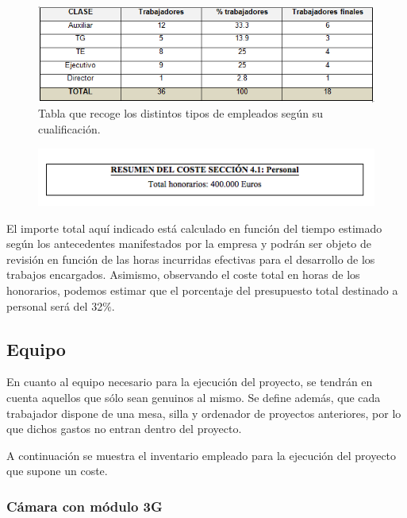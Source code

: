 \documentclass[12pt,oneside,a4paper]{article}
\numberwithin{figure}{section}
\begin{document}
\begin{figure}[H]
\begin{center}
\includegraphics[scale=.8]{Presupuesto_5.png}
\caption{Tabla que recoge los distintos tipos de empleados según su cualificación.}
\end{center}
\end{figure}

\begin{figure}[H]
\begin{center}
\includegraphics[scale=.9]{Presupuesto6.png}
\end{center}
\end{figure}

El importe total aquí indicado está calculado en función del tiempo estimado según los antecedentes manifestados por la empresa y podrán ser objeto de revisión en función de las horas incurridas efectivas para el desarrollo de los trabajos encargados. Asimismo, observando el coste total en horas de los honorarios, podemos estimar que el porcentaje del presupuesto total destinado a personal será del 32$\%$.


\subsection{Equipo}

En cuanto al equipo necesario para la ejecución del proyecto, se tendrán en cuenta aquellos que sólo sean genuinos al mismo. Se define además, que cada trabajador dispone de una mesa, silla y ordenador de proyectos anteriores, por lo que dichos gastos no entran dentro del proyecto. 

A continuación se muestra el inventario empleado para la ejecución del proyecto que supone un coste.

\subsubsection{Cámara con módulo 3G}
\end{document}

